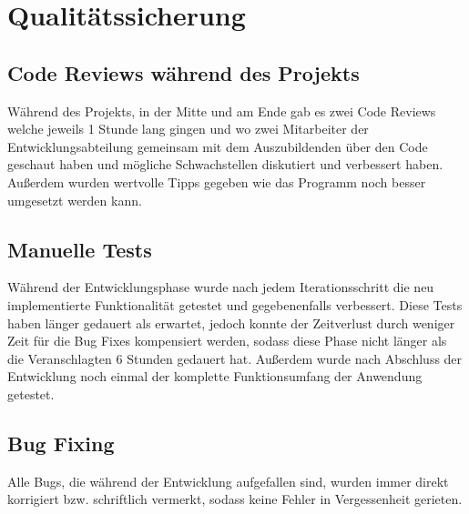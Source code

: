 \section{Qualitätssicherung} 
\label{sec:Qualitätssicherung}

\subsection{Code Reviews während des Projekts}
\label{sec:Code Reviews während des Projekts}
Während des Projekts, in der Mitte und am Ende gab es zwei Code Reviews welche jeweils 1 Stunde lang gingen und wo zwei Mitarbeiter der Entwicklungsabteilung gemeinsam mit dem Auszubildenden über den Code geschaut haben und mögliche Schwachstellen diskutiert und verbessert haben. Außerdem wurden wertvolle Tipps gegeben wie das Programm noch besser umgesetzt werden kann.    

\subsection{Manuelle Tests}
\label{sec:Manuelle Tests}
Während der Entwicklungsphase wurde nach jedem Iterationsschritt die neu implementierte Funktionalität getestet und gegebenenfalls verbessert. Diese Tests haben länger gedauert als erwartet, jedoch konnte der Zeitverlust durch weniger Zeit für die Bug Fixes kompensiert werden, sodass diese Phase nicht länger als die Veranschlagten 6 Stunden gedauert hat. Außerdem wurde nach Abschluss der Entwicklung noch einmal der komplette Funktionsumfang der Anwendung getestet. 

\subsection{Bug Fixing}
\label{sec:Bug Fixing}
Alle Bugs, die während der Entwicklung aufgefallen sind, wurden immer direkt korrigiert bzw. schriftlich vermerkt, sodass keine Fehler in Vergessenheit gerieten.